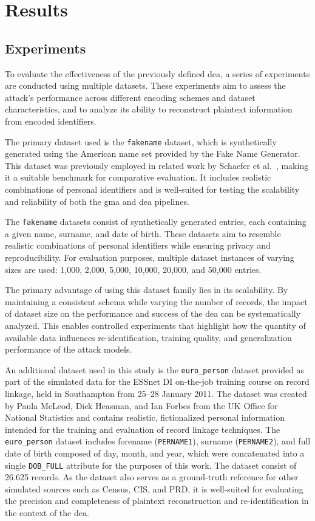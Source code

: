 
\chapter{Results}  \label{sec:results}


\section{Experiments}  \label{sec:experiments}

To evaluate the effectiveness of the previously defined \ac{dea}, a series of experiments are conducted using multiple datasets.
These experiments aim to assess the attack’s performance across different encoding schemes and dataset characteristics, and to analyze its ability to reconstruct plaintext information from encoded identifiers.

The primary dataset used is the \texttt{fakename} dataset, which is synthetically generated using the American name set provided by the Fake Name Generator.
This dataset was previously employed in related work by Schaefer et al.~\cite{schaefer2024}, making it a suitable benchmark for comparative evaluation.
It includes realistic combinations of personal identifiers and is well-suited for testing the scalability and reliability of both the \ac{gma} and \ac{dea} pipelines.

The \texttt{fakename} datasets consist of synthetically generated entries, each containing a given name, surname, and date of birth.
These datasets aim to resemble realistic combinations of personal identifiers while ensuring privacy and reproducibility.
For evaluation purposes, multiple dataset instances of varying sizes are used: 1{,}000, 2{,}000, 5{,}000, 10{,}000, 20{,}000, and 50{,}000 entries.

The primary advantage of using this dataset family lies in its scalability.
By maintaining a consistent schema while varying the number of records, the impact of dataset size on the performance and success of the \ac{dea} can be systematically analyzed.
This enables controlled experiments that highlight how the quantity of available data influences re-identification, training quality, and generalization performance of the attack models.

An additional dataset used in this study is the \texttt{euro\_person} dataset provided as part of the simulated data for the ESSnet DI on-the-job training course on record linkage, held in Southampton from 25--28 January 2011.
The dataset was created by Paula McLeod, Dick Heasman, and Ian Forbes from the UK Office for National Statistics and contains realistic, fictionalized personal information intended for the training and evaluation of record linkage techniques.
The \texttt{euro\_person} dataset includes forename (\texttt{PERNAME1}), surname (\texttt{PERNAME2}), and full date of birth composed of day, month, and year, which were concatenated into a single \texttt{DOB\_FULL} attribute for the purposes of this work.
The dataset consist of 26.625 records.
As the dataset also serves as a ground-truth reference for other simulated sources such as Census, CIS, and PRD, it is well-suited for evaluating the precision and completeness of plaintext reconstruction and re-identification in the context of the \ac{dea}.

